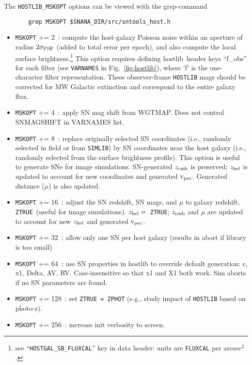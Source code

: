 \documentclass[12pt]{article}
\newcommand{\hostlib}{{\sc hostlib}}
\newcommand{\zhelio}{z_{\rm hel}}
\newcommand{\zcmb}{z_{\rm cmb}}
\newcommand{\vpec}{{\rm v}_{\rm pec}}
\newcommand{\ztrue}{{\tt ZTRUE}}
\begin{document}
{%
The {\tt HOSTLIB\_MSKOPT} options can be 
viewed with the grep-command
\begin{verbatim}
       grep MSKOPT $SNANA_DIR/src/sntools_host.h 
\end{verbatim}
%
\begin{itemize}
\item {\tt MSKOPT} += 2~: compute the host-galaxy Poisson noise within
       an aperture of radius $2\sigma_{\rm PSF}$ 
       (added to total error per epoch), and also compute
       the local surface brightness.\footnote{see 
         ``{\tt HOSTGAL\_SB\_FLUXCAL}'' key in data header: 
         units are {\tt FLUXCAL} per arcsec$^2$.}
       This option requires defining \hostlib\ header keys
       ``f\_obs'' for each filter 
       (see {\tt VARNAMES} in Fig.~\ref{fig:hostlib}), 
       where 'f' is the one-character filter representation.
       These observer-frame {\tt HOSTLIB} mags should be corrected for 
       MW Galactic extinction and correspond to the entire galaxy flux.
%
\item {\tt MSKOPT} += 4~: apply SN mag shift from WGTMAP.
      Does not control SNMAGSHIFT in VARNAMES list.
%
\item {\tt MSKOPT} += 8~: replace originally selected SN coordinates 
      (i.e., randomly selected in field or from {\tt SIMLIB})
      by SN coordinates near the host galaxy 
      (i.e., randomly selected from the surface brightness profile).
      This option is useful to generate SNe for image simulations.
      SN-generated $\zcmb$ is preserved; $\zhelio$ is updated to
      account for new coordinates and generated $\vpec$. 
      Generated distance ($\mu$) is also updated.
%
\item {\tt MSKOPT} += 16~: adjust the SN redshift, SN mags, and $\mu$ 
      to galaxy redshift, \ztrue\  (useful for image simulations).
      $\zhelio=$~\ztrue;  $\zcmb$ and $\mu$ are updated
      to account for new $\zhelio$ and generated $\vpec$.
%
\item {\tt MSKOPT} += 32~: allow only one SN per host galaxy 
                         (results in abort if library is too small)
%
\item {\tt MSKOPT} += 64~: 
  use SN properties in hostlib to override default generation:
  c, x1, Delta, AV, RV.
  Case-insensitive so that x1 and X1 both work.
  Sim aborts if no SN parameters are found.
%
\item {\tt MSKOPT} += 128~: set {\tt ZTRUE = ZPHOT} 
     (e.g., study impact of {\tt HOSTLIB} based on photo-z).
%
\item {\tt MSKOPT} += 256~: increase init verbosity to screen.

\end{itemize}}
\end{document}
